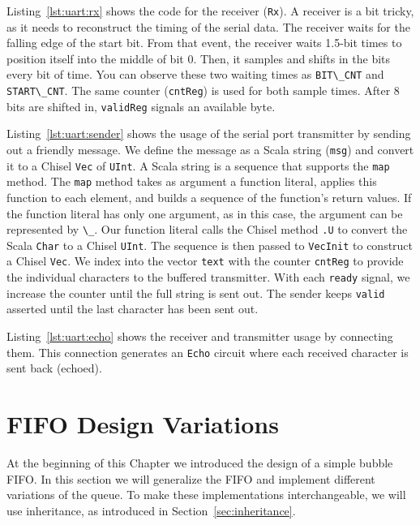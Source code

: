 \documentclass[%
    10pt,
    headinclude, footexclude,
    openright, %
    notitlepage,
    cleardoubleempty,
    headsepline,
    pointlessnumbers,
    bibtotoc, idxtotoc,
    ]{scrbook}
\newcommand{\code}[1]{{\lstinline[basicstyle=\small\ttfamily]{#1}}}
\begin{document}

Listing~\ref{lst:uart:rx} shows the code for the receiver (\code{Rx}).
A receiver is a bit tricky, as it needs to reconstruct the timing of
the serial data. The receiver waits for the falling edge of the start bit.
From that event, the receiver waits 1.5-bit times to position itself into the middle
of bit 0. Then, it samples and shifts in the bits every bit of time. You can observe these
two waiting times as \code{BIT\_CNT} and \code{START\_CNT}.
The same counter (\code{cntReg}) is used for both sample times.
After 8 bits are shifted in, \code{validReg} signals an available byte.


Listing~\ref{lst:uart:sender} shows the usage of the serial port transmitter
by sending out a friendly message. We define the message as a Scala
string (\code{msg}) and convert it to a Chisel \code{Vec} of \code{UInt}.
A Scala string is a sequence that supports the \code{map} method.
The \code{map} method takes as argument a function literal, applies this function to
each element, and builds a sequence of the function's return values.
If the function literal has only one argument, as in this case, the
argument can be represented by \code{\_}. Our function literal calls
the Chisel method \code{.U} to convert the Scala \code{Char} to a Chisel
\code{UInt}. The sequence is then passed to \code{VecInit} to construct
a Chisel \code{Vec}. We index into the vector \code{text} with the counter
\code{cntReg} to provide the individual characters to the buffered transmitter.
With each \code{ready} signal, we increase the counter until the full string
is sent out. The sender keeps \code{valid} asserted until the last character
has been sent out.


Listing~\ref{lst:uart:echo} shows the receiver and transmitter
usage by connecting them. This connection generates an \code{Echo} circuit where each
received character is sent back (echoed).

\section{FIFO Design Variations}
\label{sec:more:fifo}

At the beginning of this Chapter we introduced the design of a simple bubble FIFO.
In this section we will generalize the FIFO and implement different variations of the queue.
To make these implementations interchangeable, we will use inheritance,
as introduced in Section~\ref{sec:inheritance}.
\end{document}
